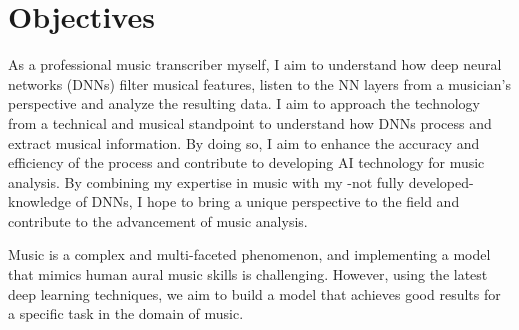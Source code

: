 \section{Objectives}

As a professional music transcriber myself, I aim to understand how deep neural networks (DNNs) filter musical features, listen to the NN layers from a musician's perspective and analyze the resulting data. I aim to approach the technology from a technical and musical standpoint to understand how DNNs process and extract musical information. By doing so, I aim to enhance the accuracy and efficiency of the process and contribute to developing AI technology for music analysis. By combining my expertise in music with my -not fully developed- knowledge of DNNs, I hope to bring a unique perspective to the field and contribute to the advancement of music analysis.

Music is a complex and multi-faceted phenomenon, and implementing a model that mimics human aural music skills is challenging. However, using the latest deep learning techniques, we aim to build a model that achieves good results for a specific task in the domain of music.